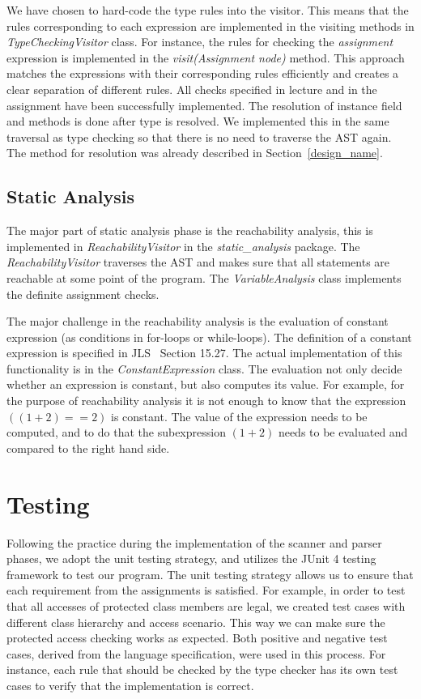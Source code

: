 \documentclass[a4paper, notitlepage]{report}
\begin{document}
We have chosen to hard-code the type rules into the visitor. This means that the rules corresponding to each expression are implemented in the visiting methods in \emph{TypeCheckingVisitor} class. For instance, the rules for checking the \emph{assignment} expression is implemented in the \emph{visit(Assignment node)} method. This approach matches the expressions with their corresponding rules efficiently and creates a clear separation of different rules. All checks specified in lecture and in the assignment have been successfully implemented. The resolution of instance field and methods is done after type is resolved. We implemented this in the same traversal as type checking so that there is no need to traverse the AST again. The method for resolution was already described in Section~\ref{design_name}.

\section{Static Analysis}

The major part of static analysis phase is the reachability analysis, this is implemented in \emph{ReachabilityVisitor} in the \emph{static\_analysis} package. The \emph{ReachabilityVisitor} traverses the AST and makes sure that all statements are reachable at some point of the program. The \emph{VariableAnalysis} class  implements the definite assignment checks.

The major challenge in the reachability analysis is the evaluation of constant expression (as conditions in for-loops or while-loops). The definition of a constant expression is specified in JLS~\cite{gosling2000java} Section 15.27. The actual implementation of this functionality is in the \emph{ConstantExpression} class. The evaluation not only decide whether an expression is constant, but also computes its value. For example, for the purpose of reachability analysis it is not enough to know that the expression $((1+2) == 2)$  is constant. The value of the expression needs to be computed, and to do that the subexpression $(1+2)$ needs to be evaluated and compared to the right hand side.

%

\chapter{Testing}
\label{testing}
Following the practice during the implementation of the scanner and parser phases, we adopt the unit testing strategy, and utilizes the JUnit 4 testing framework to test our program. The unit testing strategy allows us to ensure that each requirement from the assignments is satisfied. For example, in order to test that all accesses of protected class members are legal, we created test cases with different class hierarchy and access scenario. This way we can make sure the protected access checking works as expected. Both positive and negative test cases, derived from the language specification, were used in this process. For instance, each rule that should be checked by the type checker has its own test cases to verify that the implementation is correct.
\end{document}
